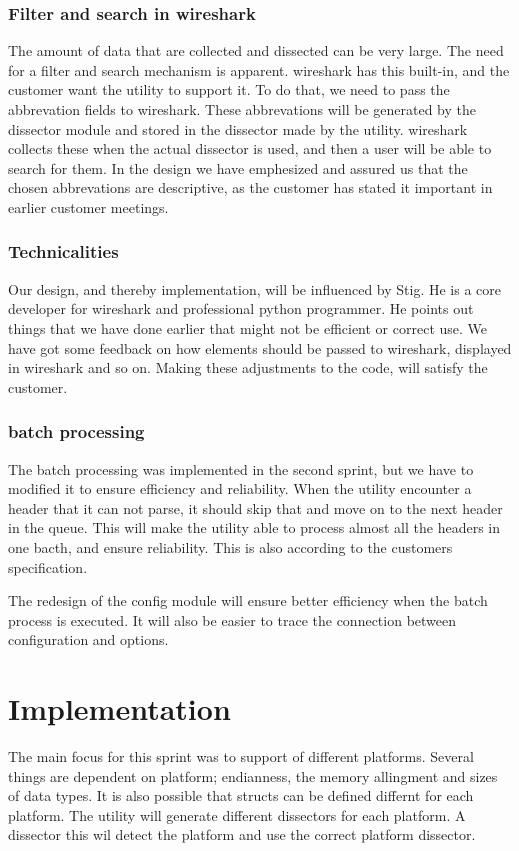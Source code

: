 \subsubsection{Filter and search in \Gls{wireshark}}
The amount of data that are collected and dissected can be very large. The need for a filter and search mechanism is apparent. \Gls{wireshark} has this built-in, and the customer want the \gls{utility} to support it. To do that, we need to pass the abbrevation fields to \Gls{wireshark}. These abbrevations will be generated by the \gls{dissector} module and stored in the \gls{dissector} made by the utility. \Gls{wireshark} collects these when the actual \gls{dissector} is used, and then a user will be able to search for them. In the design we have emphesized and assured us that the chosen abbrevations are descriptive, as the customer has stated it important in earlier customer meetings. 

\subsubsection{Technicalities}
Our design, and thereby implementation, will be influenced by Stig. He is a core developer for \Gls{wireshark} and professional \Gls{python} programmer. He points out things that we have done earlier that might not be efficient or correct use. We have got some feedback on how elements should be passed to \Gls{wireshark}, displayed in \Gls{wireshark} and so on. Making these adjustments to the code, will satisfy the customer. 

\subsubsection{\Gls{batch processing}}
The \gls{batch processing} was implemented in the second sprint, but we have to modified it to ensure efficiency and reliability. When the \gls{utility} encounter a \gls{header} that it can not parse, it should skip that and move on to the next \gls{header} in the queue. This will make the \gls{utility} able to process almost all the \glspl{header} in one bacth, and ensure reliability. This is also according to the customers specification.

The redesign of the config module will ensure better efficiency when the batch process is executed. It will also be easier to trace the connection between configuration and options. 


\section{Implementation}
The main focus for this sprint was to support of different platforms. Several 
things are dependent on platform; \gls{endianness}, the memory allingment and sizes 
of data types. It is also possible that \glspl{struct} can be defined differnt for 
each platform. The \gls{utility} will generate different \glspl{dissector} for each 
platform. A \gls{dissector} this wil detect the platform and use the correct 
platform \gls{dissector}.

